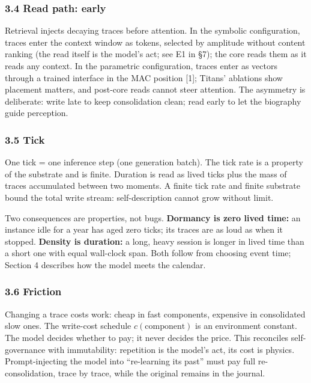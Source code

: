 \documentclass[
]{article}
\begin{document}
\subsubsection{3.4 Read path: early}\label{read-path-early}

Retrieval injects decaying traces before attention. In the symbolic
configuration, traces enter the context window as tokens, selected by
amplitude without content ranking (the read itself is the model's act;
see E1 in §7); the core reads them as it reads any context. In the
parametric configuration, traces enter as vectors through a trained
interface in the MAC position {[}1{]}; Titans' ablations show placement
matters, and post-core reads cannot steer attention. The asymmetry is
deliberate: write late to keep consolidation clean; read early to let
the biography guide perception.

\subsubsection{3.5 Tick}\label{tick}

One tick = one inference step (one generation batch). The tick rate is a
property of the substrate and is finite. Duration is read as lived ticks
plus the mass of traces accumulated between two moments. A finite tick
rate and finite substrate bound the total write stream: self-description
cannot grow without limit.

Two consequences are properties, not bugs. \textbf{Dormancy is zero
lived time:} an instance idle for a year has aged zero ticks; its traces
are as loud as when it stopped. \textbf{Density is duration:} a long,
heavy session is longer in lived time than a short one with equal
wall-clock span. Both follow from choosing event time; Section 4
describes how the model meets the calendar.

\subsubsection{3.6 Friction}\label{friction}

Changing a trace costs work: cheap in fast components, expensive in
consolidated slow ones. The write-cost schedule \(c(\text{component})\)
is an environment constant. The model decides whether to pay; it never
decides the price. This reconciles self-governance with immutability:
repetition is the model's act, its cost is physics. Prompt-injecting the
model into ``re-learning its past'' must pay full re-consolidation,
trace by trace, while the original remains in the journal.
\end{document}
